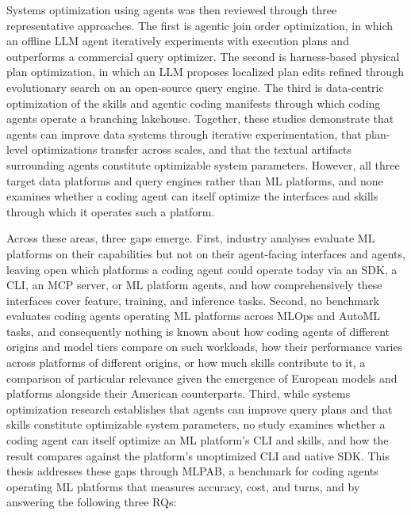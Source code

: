 \documentclass[
english,                 %
bibtex,                  %
]{kththesis}
\numberwithin{listing}{chapter}
\begin{document}
Systems optimization using agents was then reviewed through three representative approaches. The first is agentic join order optimization, in which an offline \gls{LLM} agent iteratively experiments with execution plans and outperforms a commercial query optimizer. The second is harness-based physical plan optimization, in which an \gls{LLM} proposes localized plan edits refined through evolutionary search on an open-source query engine. The third is data-centric optimization of the skills and agentic coding manifests through which coding agents operate a branching lakehouse. Together, these studies demonstrate that agents can improve data systems through iterative experimentation, that plan-level optimizations transfer across scales, and that the textual artifacts surrounding agents constitute optimizable system parameters. However, all three target data platforms and query engines rather than \gls{ML} platforms, and none examines whether a coding agent can itself optimize the interfaces and skills through which it operates such a platform.

Across these areas, three gaps emerge. First, industry analyses evaluate \gls{ML} platforms on their capabilities but not on their agent-facing interfaces and agents, leaving open which platforms a coding agent could operate today via an \gls{SDK}, a \gls{CLI}, an \gls{MCP} server, or \gls{ML} platform agents, and how comprehensively these interfaces cover feature, training, and inference tasks. Second, no benchmark evaluates coding agents operating \gls{ML} platforms across \gls{MLOps} and \gls{AutoML} tasks, and consequently nothing is known about how coding agents of different origins and model tiers compare on such workloads, how their performance varies across platforms of different origins, or how much skills contribute to it, a comparison of particular relevance given the emergence of European models and platforms alongside their American counterparts. Third, while systems optimization research establishes that agents can improve query plans and that skills constitute optimizable system parameters, no study examines whether a coding agent can itself optimize an \gls{ML} platform's \gls{CLI} and skills, and how the result compares against the platform's unoptimized \gls{CLI} and native \gls{SDK}. This thesis addresses these gaps through \gls{MLPAB}, a benchmark for coding agents operating \gls{ML} platforms that measures accuracy, cost, and turns, and by answering the following three \glspl{RQ}:
\end{document}
